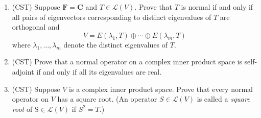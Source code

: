 \documentclass[12pt]{article}
\begin{document}
\begin{enumerate}
\item (CST) Suppose $\mathbf{F} = \mathbf{C}$ and $T \in \mathcal{L}(V)$. Prove that $T$ is normal if and only if all pairs of eigenvectors corresponding to distinct eigenvalues of $T$ are orthogonal and
    \[
        V = E(\lambda_1,T) \oplus \cdots \oplus E(\lambda_m,T)
    \]
    where $\lambda_1 , \ldots , \lambda_m$ denote the distinct eigenvalues of $T$.

\item (CST) Prove that a normal operator on a complex inner product space is self-adjoint if and only if all its eigenvalues are real.

\item (CST) Suppose $V$ is a complex inner product space. Prove that every normal operator on $V$ has a square root. (An operator $S \in \mathcal{L}(V)$ is called a \emph{square root} of S$ \in \mathcal{L}(V)$ if $S^2 = T$.)

\end{enumerate}
\end{document}
